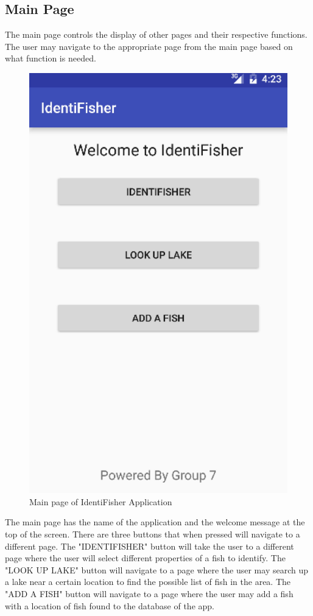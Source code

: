 \documentclass{article}
\begin{document}
\subsection{Main Page}
The main page controls the display of other pages and their respective functions. The user may navigate to the
appropriate page from the main page based on what function is needed. \\
\begin{figure}[H]
	\includegraphics[scale=0.16]{Mainpage.png}
	\caption{Main page of IdentiFisher Application}
\end{figure}
The main page has the name of the application and the welcome message at the top of the screen. There are three
buttons that when pressed will navigate to a different page. The "IDENTIFISHER" button will take the user to a different page
where the user will select different properties of a fish to identify. The "LOOK UP LAKE" button will navigate to a page where the
user may search up a lake near a certain location to find the possible list of fish in the area. The "ADD A FISH" button will navigate
to a page where the user may add a fish with a location of fish found to the database of the app.\\
\end{document}
